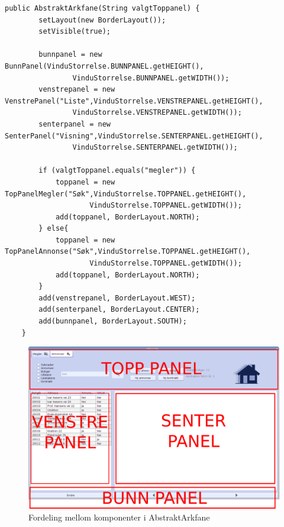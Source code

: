 \begin{lstlisting}[caption=Konstruktør til \texttt{AbstraktArkfane}. label=kode:arkfane]
    public AbstraktArkfane(String valgtToppanel) {
        setLayout(new BorderLayout());
        setVisible(true);
        
        bunnpanel = new BunnPanel(VinduStorrelse.BUNNPANEL.getHEIGHT(), 
                VinduStorrelse.BUNNPANEL.getWIDTH());
        venstrepanel = new VenstrePanel("Liste",VinduStorrelse.VENSTREPANEL.getHEIGHT(), 
                VinduStorrelse.VENSTREPANEL.getWIDTH());
        senterpanel = new SenterPanel("Visning",VinduStorrelse.SENTERPANEL.getHEIGHT(), 
                VinduStorrelse.SENTERPANEL.getWIDTH());

        if (valgtToppanel.equals("megler")) {
            toppanel = new TopPanelMegler("Søk",VinduStorrelse.TOPPANEL.getHEIGHT(), 
                    VinduStorrelse.TOPPANEL.getWIDTH());
            add(toppanel, BorderLayout.NORTH);
        } else{
            toppanel = new TopPanelAnnonse("Søk",VinduStorrelse.TOPPANEL.getHEIGHT(), 
                    VinduStorrelse.TOPPANEL.getWIDTH());
            add(toppanel, BorderLayout.NORTH);
        }
        add(venstrepanel, BorderLayout.WEST);
        add(senterpanel, BorderLayout.CENTER);
        add(bunnpanel, BorderLayout.SOUTH);
    }
\end{lstlisting}


\begin{figure}[ht]
 \includegraphics[width=\textwidth,height=\textheight,keepaspectratio]{./img/produktdokumentasjon/swing_componenter/AbstraktArkfane.png}
 \caption{Fordeling mellom komponenter i AbstraktArkfane}
 \label{fig:asbtarkfane}
\end{figure}



